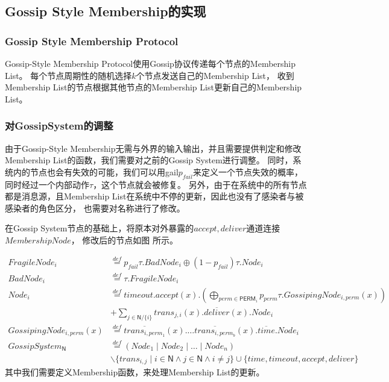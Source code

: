 \subsection{Gossip Style Membership的实现}

\subsubsection{Gossip Style Membership Protocol}
Gossip-Style Membership Protocol使用Gossip协议传递每个节点的Membership List。
每个节点周期性的随机选择$k$个节点发送自己的Membership List，
收到Membership List的节点根据其他节点的Membership List更新自己的Membership List。

\subsubsection{对GossipSystem的调整}
由于Gossip-Style Membership无需与外界的输入输出，并且需要提供判定和修改Membership List的函数，我们需要对之前的Gossip System进行调整。
同时，系统内的节点也会有失效的可能，我们可以用gail$p_{fail}$来定义一个节点失效的概率，同时经过一个内部动作$\tau$，这个节点就会被修复。
另外，由于在系统中的所有节点都是消息源，且Membership List在系统中不停的更新，因此也没有了感染者与被感染者的角色区分，
也需要对名称进行了修改。

在Gossip System节点的基础上，将原本对外暴露的$accept,deliver$通道连接$Membership Node$，
修改后的节点如图
所示。

\begin{align*}
    FragileNode_i&\stackrel{def}{=}p_{fail}\tau.BadNode_i\oplus (1-p_{fail})\tau.Node_i\\
    BadNode_i&\stackrel{def}{=}\tau.FragileNode_i\\
    Node_i&\stackrel{def}{=}timeout.accept(x).(\bigoplus_{perm\in \mathsf{PERM}_i} p_{perm}\tau.GossipingNode_{i,perm}(x))\\
     &+\sum_{j\in \mathsf{N}/\{i\}}trans_{j,i}(x).\overline{deliver}(x).Node_i\\
    GossipingNode_{i,perm}(x)&\stackrel{def}{=}\overline{trans_{i,perm_{1}}}(x).\dots \overline{trans_{i,perm_{b}}}(x).\overline{time}.Node_i\\
    GossipSystem_\mathsf{N}&\stackrel{def}{=}(Node_1\mid Node_2\mid \dots \mid Node_n)\\
    &\backslash \{trans_{i,j}\mid i\in \mathsf{N} \wedge j\in \mathsf{N} \wedge i\neq j\}\cup \{time, timeout, accept, deliver\}
 \end{align*}
 其中我们需要定义Membership函数，来处理Membership List的更新。

